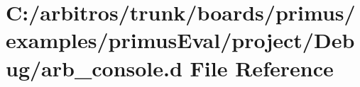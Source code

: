 \hypertarget{boards_2primus_2examples_2primus_eval_2project_2_debug_2arb__console_8d}{\section{C\-:/arbitros/trunk/boards/primus/examples/primus\-Eval/project/\-Debug/arb\-\_\-console.d File Reference}
\label{boards_2primus_2examples_2primus_eval_2project_2_debug_2arb__console_8d}
}
